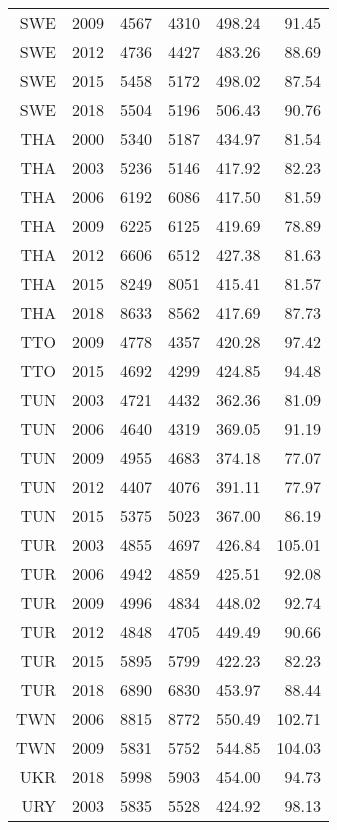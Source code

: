 \begin{longtable}{|r|r|r|r|r|r|}
    SWE   & 2009  & 4567  & 4310  & 498.24 & 91.45 \\
    SWE   & 2012  & 4736  & 4427  & 483.26 & 88.69 \\
    SWE   & 2015  & 5458  & 5172  & 498.02 & 87.54 \\
    SWE   & 2018  & 5504  & 5196  & 506.43 & 90.76 \\
    THA   & 2000  & 5340  & 5187  & 434.97 & 81.54 \\
    THA   & 2003  & 5236  & 5146  & 417.92 & 82.23 \\
    THA   & 2006  & 6192  & 6086  & 417.50 & 81.59 \\
    THA   & 2009  & 6225  & 6125  & 419.69 & 78.89 \\
    THA   & 2012  & 6606  & 6512  & 427.38 & 81.63 \\
    THA   & 2015  & 8249  & 8051  & 415.41 & 81.57 \\
    THA   & 2018  & 8633  & 8562  & 417.69 & 87.73 \\
    TTO   & 2009  & 4778  & 4357  & 420.28 & 97.42 \\
    TTO   & 2015  & 4692  & 4299  & 424.85 & 94.48 \\
    TUN   & 2003  & 4721  & 4432  & 362.36 & 81.09 \\
    TUN   & 2006  & 4640  & 4319  & 369.05 & 91.19 \\
    TUN   & 2009  & 4955  & 4683  & 374.18 & 77.07 \\
    TUN   & 2012  & 4407  & 4076  & 391.11 & 77.97 \\
    TUN   & 2015  & 5375  & 5023  & 367.00 & 86.19 \\
    TUR   & 2003  & 4855  & 4697  & 426.84 & 105.01 \\
    TUR   & 2006  & 4942  & 4859  & 425.51 & 92.08 \\
    TUR   & 2009  & 4996  & 4834  & 448.02 & 92.74 \\
    TUR   & 2012  & 4848  & 4705  & 449.49 & 90.66 \\
    TUR   & 2015  & 5895  & 5799  & 422.23 & 82.23 \\
    TUR   & 2018  & 6890  & 6830  & 453.97 & 88.44 \\
    TWN   & 2006  & 8815  & 8772  & 550.49 & 102.71 \\
    TWN   & 2009  & 5831  & 5752  & 544.85 & 104.03 \\
    UKR   & 2018  & 5998  & 5903  & 454.00 & 94.73 \\
    URY   & 2003  & 5835  & 5528  & 424.92 & 98.13 \\

\end{longtable}

